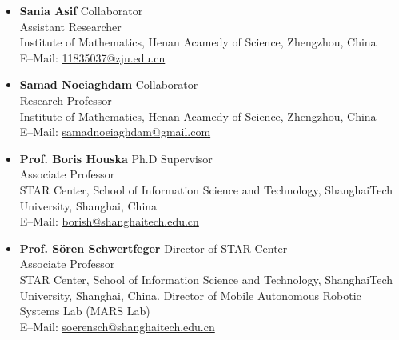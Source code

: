\documentclass[paper=a4,fontsize=11pt]{scrartcl} %
\newcommand{\NewPart}[1]{\section*{\uppercase{#1}}}
\begin{document}
\begin{itemize}
	\item \textbf{Sania Asif} {\hfill Collaborator}\\
Assistant Researcher \\Institute of Mathematics, Henan Acamedy of Science, Zhengzhou, China \\
E--Mail: \url{11835037@zju.edu.cn}

	\item \textbf{Samad Noeiaghdam} {\hfill Collaborator}\\
Research Professor \\Institute of Mathematics, Henan Acamedy of Science, Zhengzhou, China \\
E--Mail: \url{samadnoeiaghdam@gmail.com}


	\item \textbf{Prof. Boris Houska} {\hfill Ph.D Supervisor}\\
Associate Professor\\ STAR Center, School of Information Science and
Technology, ShanghaiTech University, Shanghai, China\\
E--Mail: \url{borish@shanghaitech.edu.cn}

	\item \textbf{Prof. S\"oren Schwertfeger} {\hfill Director of STAR Center}\\
Associate Professor\\ STAR Center, School of Information Science and
Technology, ShanghaiTech University, Shanghai, China. Director of Mobile Autonomous Robotic Systems Lab (MARS Lab)\\
E--Mail: \url{soerensch@shanghaitech.edu.cn}
\end{itemize}
\vspace{2cm}
\end{document}
